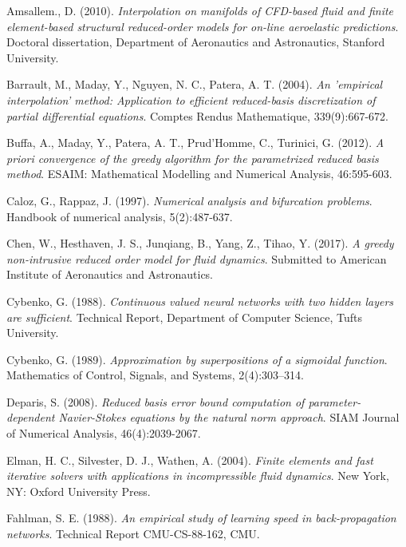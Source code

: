 \documentclass[12pt, a4paper, twoside, openright]{report}
\numberwithin{equation}{chapter}
\theoremstyle{theorem}
\theoremstyle{definition}
\theoremstyle{remark}
\theoremstyle{proposition}
\numberwithin{figure}{chapter}
\begin{document}
	\begin{thebibliography}{50}
	
		Amsallem., D. (2010). \emph{Interpolation on manifolds of CFD-based fluid and finite element-based structural reduced-order models for on-line aeroelastic predictions}. Doctoral dissertation, Department of Aeronautics and Astronautics, Stanford University.
	
		Barrault, M., Maday, Y., Nguyen, N. C., Patera, A. T. (2004). \emph{An 'empirical interpolation' method: Application to efficient reduced-basis discretization of partial differential equations}. Comptes Rendus Mathematique, 339(9):667-672.
		
		Buffa, A., Maday, Y., Patera, A. T., Prud'Homme, C., Turinici, G. (2012). \emph{A priori convergence of the greedy algorithm for the parametrized reduced basis method}. ESAIM: Mathematical Modelling and Numerical Analysis, 46:595-603.
		
		Caloz, G., Rappaz, J. (1997). \emph{Numerical analysis and bifurcation problems}. Handbook of numerical analysis, 5(2):487-637.
		
		Chen, W., Hesthaven, J. S., Junqiang, B., Yang, Z., Tihao, Y. (2017). \emph{A greedy non-intrusive reduced order model for fluid dynamics}. Submitted to American Institute of Aeronautics and Astronautics.
	
		Cybenko, G. (1988). \emph{Continuous valued neural networks with two hidden layers are sufficient}. Technical Report, Department of Computer Science, Tufts University.
		
		Cybenko, G. (1989). \emph{Approximation by superpositions of a sigmoidal function}. Mathematics of Control, Signals, and Systems, 2(4):303–314.
		
		Deparis, S. (2008). \emph{Reduced basis error bound computation of parameter-dependent Navier-Stokes equations by the natural norm approach}. SIAM Journal of Numerical Analysis, 46(4):2039-2067.
		
		Elman, H. C., Silvester, D. J., Wathen, A. (2004). \emph{Finite elements and fast iterative solvers with applications in incompressible fluid dynamics}. New York, NY: Oxford University Press.
		
		Fahlman, S. E. (1988). \emph{An empirical study of learning speed in back-propagation networks}. Technical Report CMU-CS-88-162, CMU.
		

\end{thebibliography}
\end{document}
